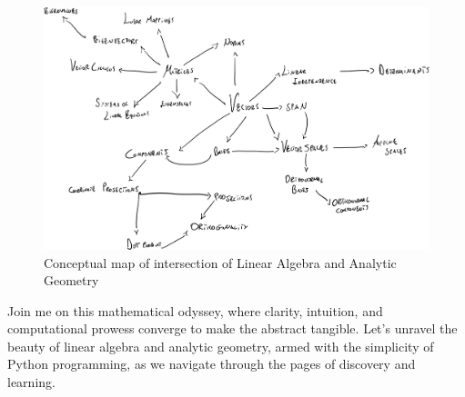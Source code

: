 \vspace{10pt}

\begin{figure}[h]
    \centering
    \includegraphics[scale=0.15]{Images/Linear_Algebra-map.png}
    \caption{Conceptual map of intersection of Linear Algebra and Analytic Geometry}
    \label{fig:conceptual-map}
\end{figure}

\noindent
Join me on this mathematical odyssey, where clarity, intuition, and computational prowess converge to make the abstract tangible. Let's unravel the beauty of linear algebra and analytic geometry, armed with the simplicity of Python programming, as we navigate through the pages of discovery and learning.




